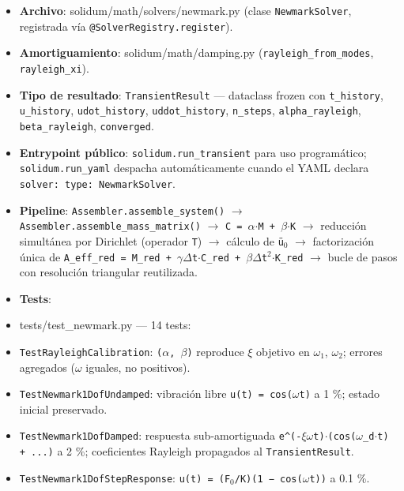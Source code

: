 \documentclass[11pt,letterpaper,oneside]{report}
\begin{document}
\begin{itemize}
  \item \textbf{Archivo}: solidum/math/solvers/newmark.py (clase \texttt{NewmarkSolver}, registrada vía \texttt{@SolverRegistry.register}).
  \item \textbf{Amortiguamiento}: solidum/math/damping.py (\texttt{rayleigh\_from\_modes}, \texttt{rayleigh\_xi}).
  \item \textbf{Tipo de resultado}: \texttt{TransientResult} --- dataclass frozen con \texttt{t\_history}, \texttt{u\_history}, \texttt{udot\_history}, \texttt{uddot\_history}, \texttt{n\_steps}, \texttt{alpha\_rayleigh}, \texttt{beta\_rayleigh}, \texttt{converged}.
  \item \textbf{Entrypoint público}: \texttt{solidum.run\_transient} para uso programático; \texttt{solidum.run\_yaml} despacha automáticamente cuando el YAML declara \texttt{solver: type: NewmarkSolver}.
  \item \textbf{Pipeline}: \texttt{Assembler.assemble\_system()} \ensuremath{\to} \texttt{Assembler.assemble\_mass\_matrix()} \ensuremath{\to} \texttt{C = \ensuremath{\alpha}\ensuremath{\cdot}M + \ensuremath{\beta}\ensuremath{\cdot}K} \ensuremath{\to} reducción simultánea por Dirichlet (operador \texttt{T}) \ensuremath{\to} cálculo de \texttt{ü\ensuremath{_{0}}} \ensuremath{\to} factorización única de \texttt{A\_eff\_red = M\_red + \ensuremath{\gamma}\ensuremath{\Delta}t\ensuremath{\cdot}C\_red + \ensuremath{\beta}\ensuremath{\Delta}t\ensuremath{^{2}}\ensuremath{\cdot}K\_red} \ensuremath{\to} bucle de pasos con resolución triangular reutilizada.
  \item \textbf{Tests}:
  \item tests/test\_newmark.py --- 14 tests:
  \item \texttt{TestRayleighCalibration}: \texttt{(\ensuremath{\alpha}, \ensuremath{\beta})} reproduce \ensuremath{\xi} objetivo en \ensuremath{\omega}\ensuremath{_{1}}, \ensuremath{\omega}\ensuremath{_{2}}; errores agregados (\ensuremath{\omega} iguales, no positivos).
  \item \texttt{TestNewmark1DofUndamped}: vibración libre \texttt{u(t) = cos(\ensuremath{\omega}t)} a 1 \%; estado inicial preservado.
  \item \texttt{TestNewmark1DofDamped}: respuesta sub-amortiguada \texttt{e\textasciicircum{}(-\ensuremath{\xi}\ensuremath{\omega}t)\ensuremath{\cdot}(cos(\ensuremath{\omega}\_d\ensuremath{\cdot}t) + ...)} a 2 \%; coeficientes Rayleigh propagados al \texttt{TransientResult}.
  \item \texttt{TestNewmark1DofStepResponse}: \texttt{u(t) = (F\ensuremath{_{0}}/K)(1 − cos(\ensuremath{\omega}t))} a 0.1 \%.

\end{itemize}
\end{document}
